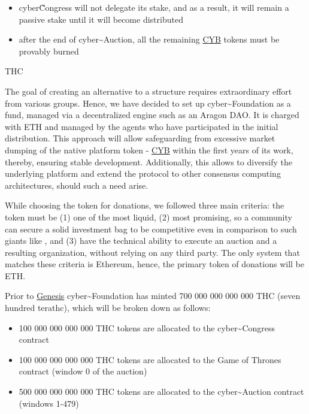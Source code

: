 \documentclass[8pt,oneside]{amsart}
\makeatletter
\newcommand{\linkred}[2]{\href{#1}{\color{red}{#2}}}
\renewcommand\subsection{\@startsection{subsection}
                                    {2}{\z@}
                                    {-3.25ex\@plus -1ex \@minus -.2ex}
                                    {0ex \@plus .2ex}
                                    {\play\Large}
                        }
\newcommand{\titleSection}[1]{\subsection{#1}}
\makeatother
\begin{document}
\begin{itemize}
\item cyber\~Congress will not delegate its stake, and as a result, it will remain a passive stake until it will become distributed
\item after the end of cyber\~{}Auction, all the remaining {\hyperref[cyb]{CYB}} tokens must be provably burned
\end{itemize}

\titleSection{THC}\label{thc}

The goal of creating an alternative to a \linkred{https://google.com}{Google-like} structure requires extraordinary effort from various groups. Hence, we have decided to set up cyber\~{}Foundation as a fund, managed via a decentralized engine such as an Aragon DAO. It is charged with ETH and managed by the agents who have participated in the initial distribution. This approach will allow safeguarding from excessive market dumping of the native platform token - {\hyperref[cyb]{CYB}} within the first years of its work, thereby, ensuring stable development. Additionally, this allows to diversify the underlying platform and extend the protocol to other consensus computing architectures, should such a need arise.

While choosing the token for donations, we followed three main criteria: the token must be (1) one of the most liquid, (2) most promising, so a community can secure a solid investment bag to be competitive even in comparison to such giants like \linkred{https://google.com}{Google}, and (3) have the technical ability to execute an auction and a resulting organization, without relying on any third party. The only system that matches these criteria is Ethereum, hence, the primary token of donations will be ETH.

Prior to \hyperlink{genesis}{Genesis} cyber\~{}Foundation has minted 700 000 000 000 000 THC (seven hundred terathc), which will be broken down as follows:

\begin{itemize}
\item 100 000 000 000 000 THC tokens are allocated to the cyber\~{}Congress contract
\item 100 000 000 000 000 THC tokens are allocated to the Game of Thrones contract (window 0 of the auction)
\item 500 000 000 000 000 THC tokens are allocated to the cyber\~{}Auction contract (windows 1-479)
\end{itemize}
\end{document}
